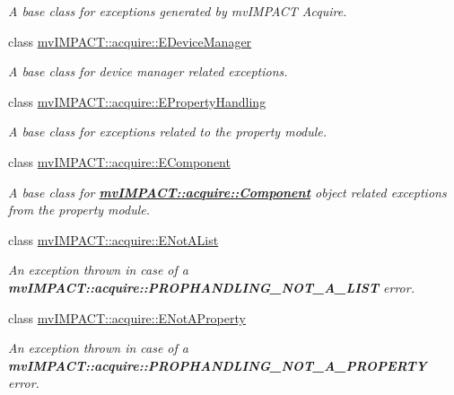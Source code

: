 \begin{DoxyCompactItemize}
\begin{DoxyCompactList}\small\item\em A base class for exceptions generated by mv\+I\+M\+P\+A\+C\+T Acquire. \end{DoxyCompactList}\item 
class \hyperlink{classmv_i_m_p_a_c_t_1_1acquire_1_1_e_device_manager}{mv\+I\+M\+P\+A\+C\+T\+::acquire\+::\+E\+Device\+Manager}
\begin{DoxyCompactList}\small\item\em A base class for device manager related exceptions. \end{DoxyCompactList}\item 
class \hyperlink{classmv_i_m_p_a_c_t_1_1acquire_1_1_e_property_handling}{mv\+I\+M\+P\+A\+C\+T\+::acquire\+::\+E\+Property\+Handling}
\begin{DoxyCompactList}\small\item\em A base class for exceptions related to the property module. \end{DoxyCompactList}\item 
class \hyperlink{classmv_i_m_p_a_c_t_1_1acquire_1_1_e_component}{mv\+I\+M\+P\+A\+C\+T\+::acquire\+::\+E\+Component}
\begin{DoxyCompactList}\small\item\em A base class for {\bfseries \hyperlink{classmv_i_m_p_a_c_t_1_1acquire_1_1_component}{mv\+I\+M\+P\+A\+C\+T\+::acquire\+::\+Component}} object related exceptions from the property module. \end{DoxyCompactList}\item 
class \hyperlink{classmv_i_m_p_a_c_t_1_1acquire_1_1_e_not_a_list}{mv\+I\+M\+P\+A\+C\+T\+::acquire\+::\+E\+Not\+A\+List}
\begin{DoxyCompactList}\small\item\em An exception thrown in case of a {\bfseries mv\+I\+M\+P\+A\+C\+T\+::acquire\+::\+P\+R\+O\+P\+H\+A\+N\+D\+L\+I\+N\+G\+\_\+\+N\+O\+T\+\_\+\+A\+\_\+\+L\+I\+S\+T} error. \end{DoxyCompactList}\item 
class \hyperlink{classmv_i_m_p_a_c_t_1_1acquire_1_1_e_not_a_property}{mv\+I\+M\+P\+A\+C\+T\+::acquire\+::\+E\+Not\+A\+Property}
\begin{DoxyCompactList}\small\item\em An exception thrown in case of a {\bfseries mv\+I\+M\+P\+A\+C\+T\+::acquire\+::\+P\+R\+O\+P\+H\+A\+N\+D\+L\+I\+N\+G\+\_\+\+N\+O\+T\+\_\+\+A\+\_\+\+P\+R\+O\+P\+E\+R\+T\+Y} error. \end{DoxyCompactList}\item 

\end{DoxyCompactItemize}
